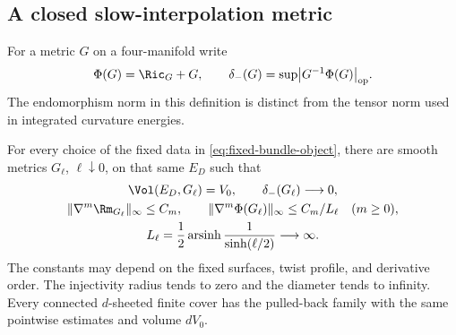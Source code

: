 \subsection{A closed slow-interpolation metric}

For a metric $G$ on a four-manifold write
\[
 \Phi(G)=\Ric_G+G,\qquad
 \delta_-(G)=\sup\bigl|G^{-1}\Phi(G)\bigr|_{\mathrm{op}}.
\]
The endomorphism norm in this definition is distinct from the tensor
norm used in integrated curvature energies.

\begin{theorem}\label{thm:fixed-bundle-approximation}
For every choice of the fixed data in \eqref{eq:fixed-bundle-object},
there are smooth metrics $G_\ell$, $\ell\downarrow0$, on that same
$E_D$ such that
\begin{gather}
 \Vol(E_D,G_\ell)=V_0,\qquad \delta_-(G_\ell)\longrightarrow0,
 \label{eq:fixed-bundle-approximation}\\
 \|\nabla^m\Rm_{G_\ell}\|_\infty\le C_m,\qquad
 \|\nabla^m\Phi(G_\ell)\|_\infty\le C_m/L_\ell
       \quad(m\ge0),\label{eq:fixed-bundle-derivatives}\\
 L_\ell=\frac12\operatorname{arsinh}\frac1{\sinh(\ell/2)}
       \longrightarrow\infty.\nonumber
\end{gather}
The constants may depend on the fixed surfaces, twist profile, and
derivative order.  The injectivity radius tends to zero and the
diameter tends to infinity.  Every connected $d$-sheeted finite cover
has the pulled-back family with the same pointwise estimates and
volume $dV_0$.
\end{theorem}

